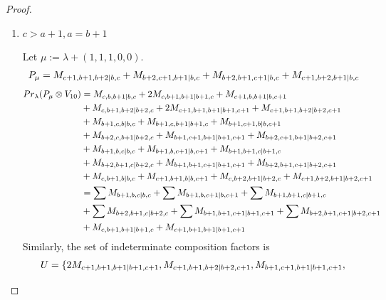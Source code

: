 \begin{proof}
\begin{enumerate}
\begin{enumerate}
      \item $c>a+1, a=b+1$ \par
        Let $\mu:=\lambda + (1,1,1,0,0) $.
        \begin{equation}\notag
          \begin{aligned}
            P_\mu = M_{c+1,b+1,b+2|b,c}
+ M_{b+2,c+1,b+1|b,c}
+ M_{b+2,b+1,c+1|b,c}
+ M_{c+1,b+2,b+1|b,c}
          \end{aligned}
        \end{equation}
        \begin{equation}\notag
          \begin{aligned}
            Pr_{\lambda}(P_\mu \otimes V_{10}) &=
M_{c,b,b+1|b,c}
+ 2M_{c,b+1,b+1|b+1,c}
+ M_{c+1,b,b+1|b,c+1}\\
                                            &
+ M_{c,b+1,b+2|b+2,c}
+ 2M_{c+1,b+1,b+1|b+1,c+1}
+ M_{c+1,b+1,b+2|b+2,c+1}\\
                                            &
+ M_{b+1,c,b|b,c}
+ M_{b+1,c,b+1|b+1,c}
+ M_{b+1,c+1,b|b,c+1}\\
                                            &
+ M_{b+2,c,b+1|b+2,c}
+ M_{b+1,c+1,b+1|b+1,c+1}
+ M_{b+2,c+1,b+1|b+2,c+1}\\
                                            &
+ M_{b+1,b,c|b,c}
+ M_{b+1,b,c+1|b,c+1}
+ M_{b+1,b+1,c|b+1,c}\\
                                            &
+ M_{b+2,b+1,c|b+2,c}
+ M_{b+1,b+1,c+1|b+1,c+1}
+ M_{b+2,b+1,c+1|b+2,c+1}\\
                                            &
+ M_{c,b+1,b|b,c}
+ M_{c+1,b+1,b|b,c+1}
+ M_{c,b+2,b+1|b+2,c}
+ M_{c+1,b+2,b+1|b+2,c+1} \\
                                               &=
\sum M_{b+1,b,c|b,c}
+ \sum M_{b+1,b,c+1|b,c+1}
+ \sum M_{b+1,b+1,c|b+1,c}\\
                                            &
+ \sum M_{b+2,b+1,c|b+2,c}
+ \sum M_{b+1,b+1,c+1|b+1,c+1}
+ \sum M_{b+2,b+1,c+1|b+2,c+1}\\
                                            &
+  M_{c,b+1,b+1|b+1,c}
+  M_{c+1,b+1,b+1|b+1,c+1}
          \end{aligned}
        \end{equation}
      Similarly, the set of indeterminate composition factors is 
\begin{equation}\notag
  \begin{aligned}
    U = \{
2M_{c+1,b+1,b+1|b+1,c+1},
M_{c+1,b+1,b+2|b+2,c+1},
M_{b+1,c+1,b+1|b+1,c+1},

\end{aligned}
\end{equation}
\end{enumerate}
\end{enumerate}
\end{proof}

